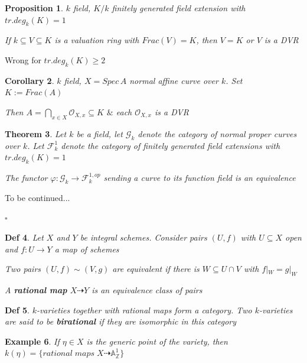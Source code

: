 \documentclass{article}
\newtheorem{theorem}{Theorem}[section]
\newtheorem{definition}[theorem]{Def}
\newtheorem{corollary}[theorem]{Corollary}
\newtheorem{example}[theorem]{Example}
\newtheorem{proposition}[theorem]{Proposition}
\newenvironment{Proof}{{\noindent \indent \it Proof:\quad}}{\hfill $\square$\par}
\begin{document}
\begin{proposition}
    $k$ field, $K/k$ finitely generated field extension with $tr.deg_k(K)=1$

    If $k\subseteq V \subseteq K$ is a valuation ring with $Frac(V)=K$, then $V=K$ or $V$ is a DVR
\end{proposition}

Wrong for $tr.deg_k(K)\geq 2$

\begin{corollary}
    $k$ field, $X=Spec\,A$ normal affine curve over $k$. Set $K:=Frac(A)$

    Then $A = \bigcap \limits_{x\in X} \mathcal O_{X,x} \subseteq K$ $\&$ each $\mathcal O_{X,x}$ is a DVR
\end{corollary}

\begin{theorem}
    Let $k$ be a field, let $\mathcal G_k$ denote the category of normal proper curves over $k$. Let $\mathcal F_k^1$ denote the category of finitely generated field extensions with $tr.deg_k(K)=1$

    The functor $\varphi : \mathcal G_k \to \mathcal F_k^{1,op}$ sending a curve to its function field is an equivalence
\end{theorem}
\begin{Proof}
    To be continued...
    
\end{Proof}

\begin{definition}
    Let $X$ and $Y$ be integral schemes. Consider pairs $(U,f)$ with $U\subseteq X$ open and $f:U\to Y$ a map of schemes

    Two pairs $(U,f)\sim(V,g)$ are equivalent if there is $W\subseteq U\cap V$ with $f|_W=g|_W$

    A \textbf{rational map} $X\dashrightarrow Y$ is an equivalence class of pairs
\end{definition}

\begin{definition}
    $k$-varieties together with rational maps form a category. Two $k$-varieties are said to be \textbf{birational} if they are isomorphic in this category
\end{definition}

\begin{example}
    If $\eta \in X$ is the generic point of the variety, then $k(\eta)=\{rational\; maps\; X\dashrightarrow \mathbb A_{\mathbb Z}^1 \}$
\end{example}
\end{document}
